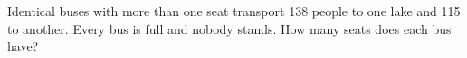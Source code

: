 Identical buses with more than one seat transport 138 people to one lake and 115 to another. Every bus is full and nobody stands. How many seats does each bus have?
